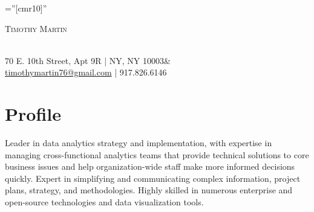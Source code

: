\documentclass[a4paper,10pt]{article}
\begin{document}
\pagestyle{empty} %
\font\fb=''[cmr10]'' %


\par{\centering
		{\huge\textsc{Timothy} \textsc{Martin}
	}\par}
	
	\par{\centering
		{\footnotesize\\{70 E. 10th Street, Apt 9R | NY, NY 10003}& \\\href{mailto:timothymartin76@gmail.com}{timothymartin76@gmail.com} | 917.826.6146
	}\par}



\section{Profile}
\small {Leader in data analytics strategy and implementation, with expertise in managing cross-functional analytics teams that provide technical solutions to core business issues and help organization-wide staff make more informed decisions quickly. Expert in simplifying and communicating complex information, project plans, strategy, and methodologies. Highly skilled in numerous enterprise and open-source technologies and data visualization tools.
} 
\end{document}
